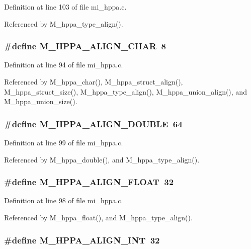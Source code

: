 Definition at line 103 of file mi\_\-hppa.c.

Referenced by M\_\-hppa\_\-type\_\-align().
\subsubsection{\setlength{\rightskip}{0pt plus 5cm}\#define M\_\-HPPA\_\-ALIGN\_\-CHAR~8}\label{mi__hppa_8c_97d358418db3708258493874661f521d}




Definition at line 94 of file mi\_\-hppa.c.

Referenced by M\_\-hppa\_\-char(), M\_\-hppa\_\-struct\_\-align(), M\_\-hppa\_\-struct\_\-size(), M\_\-hppa\_\-type\_\-align(), M\_\-hppa\_\-union\_\-align(), and M\_\-hppa\_\-union\_\-size().
\subsubsection{\setlength{\rightskip}{0pt plus 5cm}\#define M\_\-HPPA\_\-ALIGN\_\-DOUBLE~64}\label{mi__hppa_8c_00125c0dfbc060aba934d06f0a005079}




Definition at line 99 of file mi\_\-hppa.c.

Referenced by M\_\-hppa\_\-double(), and M\_\-hppa\_\-type\_\-align().
\subsubsection{\setlength{\rightskip}{0pt plus 5cm}\#define M\_\-HPPA\_\-ALIGN\_\-FLOAT~32}\label{mi__hppa_8c_be3624b57eb6cdf8e713f29b80e68bf6}




Definition at line 98 of file mi\_\-hppa.c.

Referenced by M\_\-hppa\_\-float(), and M\_\-hppa\_\-type\_\-align().
\subsubsection{\setlength{\rightskip}{0pt plus 5cm}\#define M\_\-HPPA\_\-ALIGN\_\-INT~32}\label{mi__hppa_8c_e8797fb0a8e2c9a54f30359604c98106}




